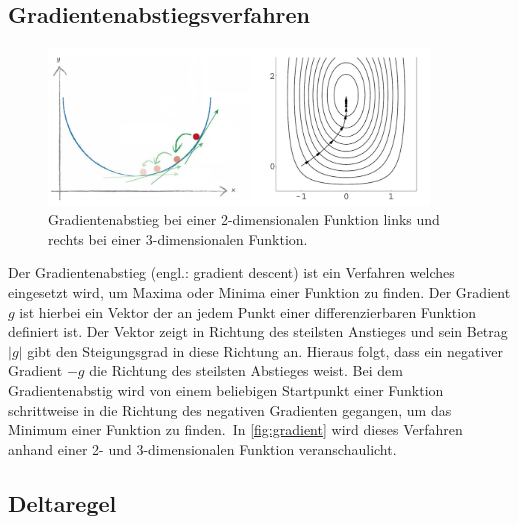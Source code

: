 \subsection{Gradientenabstiegsverfahren}\label{sec:gradient}

\begin{figure}[tb]
    \centering
        \includegraphics[width=0.9\textwidth]{Bilder/misc/Gradientenabstieg.png}
    \caption[Gradientenabstieg]{Gradientenabstieg bei einer 2-dimensionalen Funktion links und rechts bei einer 3-dimensionalen Funktion.\protect\footnotemark{}}
    \label{fig:gradient}
\end{figure}
\addtocounter{footnote}{-1}     %
\addtocounter{Hfootnote}{-1}    %
\wrapfigfoot{}

Der Gradientenabstieg (engl.: gradient descent) ist ein Verfahren welches eingesetzt wird, um Maxima oder Minima einer Funktion zu finden. Der Gradient $g$ ist hierbei ein Vektor der an jedem Punkt einer differenzierbaren Funktion definiert ist. Der Vektor zeigt in Richtung des steilsten Anstieges und sein Betrag $|g|$ gibt den Steigungsgrad in diese Richtung an. Hieraus folgt, dass ein negativer Gradient $-g$ die Richtung des steilsten Abstieges weist. Bei dem Gradientenabstig wird von einem beliebigen Startpunkt einer Funktion schrittweise in die Richtung des negativen Gradienten gegangen, um das Minimum einer Funktion zu finden.\, In \autoref{fig:gradient} wird dieses Verfahren anhand einer 2- und 3-dimensionalen Funktion veranschaulicht.


\subsection{Deltaregel}\label{sec:deltaregel}

